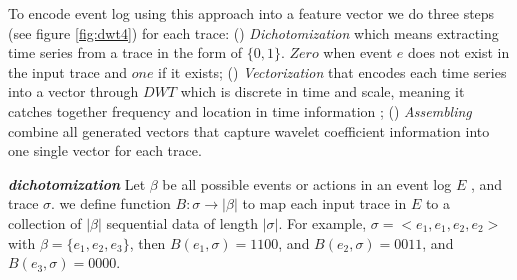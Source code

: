 To encode event log using this approach into a feature vector we do three steps (see figure \ref{fig:dwt4}) for each trace: () \textit{Dichotomization} which means extracting time series from a trace in the form of $\{0, 1\}$. $Zero$ when event $e$ does not exist in the input trace and $one$ if it exists; () \textit{Vectorization} that encodes each time series into a vector through $DWT$ which is discrete in time and scale, meaning it catches together frequency and location in time information \cite{weeks2003discrete}; () \textit{Assembling} combine all generated vectors that capture wavelet coefficient information into one single vector for each trace.  

\begin{definition}{\textit{\textbf{dichotomization}}}
 Let $\beta$ be all possible events or actions in an event log $E$ , and trace $\sigma$. we define function $B: \sigma \to  |\beta|$  to map each input trace in $E$ to a collection of $|\beta|$ sequential data of length $|\sigma|$. For example, $\sigma = <e_1, e_1, e_2, e_2>$ with $\beta = \{e_1, e_2, e_3\}$, then $B(e_1, \sigma) =1100$, and $B(e_2, \sigma) = 0011$, and $B(e_3, \sigma) = 0000$.	
\end{definition}


